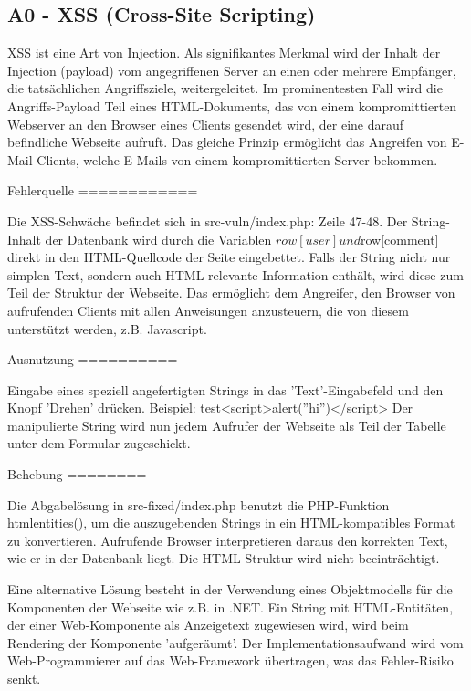 \documentclass[12pt,a4paper,titlepage,oneside]{scrartcl}
\begin{document}
\subsection{A0 - XSS (Cross-Site Scripting)}

XSS ist eine Art von Injection. Als signifikantes Merkmal wird der Inhalt der Injection (payload) vom angegriffenen Server an einen oder mehrere Empfänger, die tatsächlichen Angriffsziele, weitergeleitet. Im prominentesten Fall wird die Angriffs-Payload Teil eines HTML-Dokuments, das von einem kompromittierten Webserver an den Browser eines Clients gesendet wird, der eine darauf befindliche Webseite aufruft. Das gleiche Prinzip ermöglicht das Angreifen von E-Mail-Clients, welche E-Mails von einem kompromittierten Server bekommen.

Fehlerquelle
============

Die XSS-Schwäche befindet sich in src-vuln/index.php: Zeile 47-48.
Der String-Inhalt der Datenbank wird durch die Variablen $row[user] und $row[comment] direkt in den HTML-Quellcode der Seite eingebettet. Falls der String nicht nur simplen Text, sondern auch HTML-relevante Information enthält, wird diese zum Teil der Struktur der Webseite. Das ermöglicht dem Angreifer, den Browser von aufrufenden Clients mit allen Anweisungen anzusteuern, die von diesem unterstützt werden, z.B. Javascript.

Ausnutzung
==========

Eingabe eines speziell angefertigten Strings in das 'Text'-Eingabefeld und den Knopf 'Drehen' drücken.
Beispiel: test<script>alert(''hi'')</script>
Der manipulierte String wird nun jedem Aufrufer der Webseite als Teil der Tabelle unter dem Formular zugeschickt.

Behebung
========

Die Abgabelösung in src-fixed/index.php benutzt die PHP-Funktion htmlentities(), um die auszugebenden Strings in ein HTML-kompatibles Format zu konvertieren. Aufrufende Browser interpretieren daraus den korrekten Text, wie er in der Datenbank liegt. Die HTML-Struktur wird nicht beeinträchtigt.

Eine alternative Lösung besteht in der Verwendung eines Objektmodells für die Komponenten der Webseite wie z.B. in .NET. Ein String mit HTML-Entitäten, der einer Web-Komponente als Anzeigetext zugewiesen wird, wird beim Rendering der Komponente 'aufgeräumt'. Der Implementationsaufwand wird vom Web-Programmierer auf das Web-Framework übertragen, was das Fehler-Risiko senkt.
\end{document}

